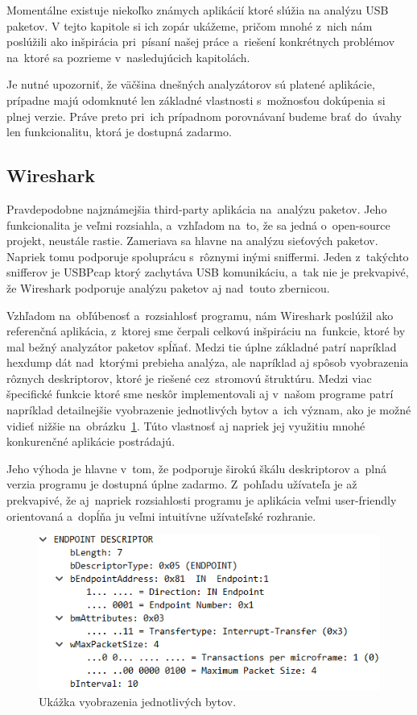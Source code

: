 Momentálne existuje niekoľko známych aplikácií ktoré slúžia na analýzu USB paketov. V tejto kapitole si ich zopár ukážeme, pričom mnohé z~nich nám poslúžili ako inšpirácia pri~písaní našej práce a~riešení konkrétnych problémov na~ktoré sa pozrieme v~nasledujúcich kapitolách. 

Je nutné upozorniť, že väčšina dnešných analyzátorov sú platené aplikácie, prípadne majú odomknuté len základné vlastnosti s~možnosťou dokúpenia si plnej verzie. Práve preto pri~ich prípadnom porovnávaní budeme brať do~úvahy len funkcionalitu, ktorá je dostupná zadarmo.

\subsection*{Wireshark}

Pravdepodobne najznámejšia third-party aplikácia na~analýzu paketov. Jeho funkcionalita je veľmi rozsiahla, a~vzhľadom na~to, že sa jedná o~open-source projekt, neustále rastie. Zameriava sa hlavne na analýzu sieťových paketov. Napriek tomu podporuje spoluprácu s~rôznymi inými sniffermi. Jeden z~takýchto snifferov je USBPcap ktorý zachytáva USB komunikáciu, a~tak nie je prekvapivé, že Wireshark podporuje analýzu paketov aj nad~touto zbernicou. 

Vzhľadom na~obľúbenosť a~rozsiahlosť programu, nám Wireshark poslúžil ako referenčná aplikácia, z~ktorej sme čerpali celkovú inšpiráciu na~funkcie, ktoré by mal bežný analyzátor paketov spĺňať. Medzi tie úplne základné patrí napríklad hexdump dát nad~ktorými prebieha analýza, ale napríklad aj spôsob vyobrazenia rôznych deskriptorov, ktoré je riešené cez~stromovú štruktúru. Medzi viac špecifické funkcie ktoré sme neskôr implementovali aj v~našom programe patrí napríklad detailnejšie vyobrazenie jednotlivých bytov a~ich význam, ako je možné vidieť nižšie na~obrázku~\ref{obr:uvod:byte_detail_foto}. Túto vlastnosť aj napriek jej využitiu mnohé konkurenčné aplikácie postrádajú.

Jeho výhoda je hlavne v~tom, že podporuje širokú škálu deskriptorov a~plná verzia programu je dostupná úplne zadarmo. Z~pohľadu užívateľa je až prekvapivé, že aj~napriek rozsiahlosti programu je aplikácia veľmi user-friendly orientovaná a~dopĺňa ju veľmi intuitívne užívateľské rozhranie.

\begin{figure}[!htb]
	\centering
	\includegraphics[width=\textwidth]{img/uvod_byte_detail}
	\caption{Ukážka vyobrazenia jednotlivých bytov.}
	\label{obr:uvod:byte_detail_foto}
\end{figure}

